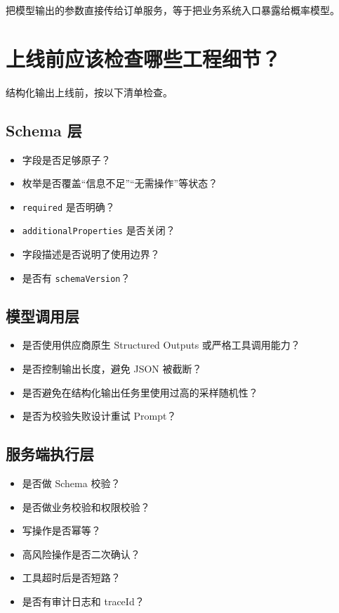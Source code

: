 \documentclass[9pt,a4paper,twocolumn]{ctexart}
\begin{document}
把模型输出的参数直接传给订单服务，等于把业务系统入口暴露给概率模型。



\section*{上线前应该检查哪些工程细节？}


结构化输出上线前，按以下清单检查。



\subsection*{Schema 层}

\begin{itemize}[itemsep=1pt, topsep=2pt]
  \item 字段是否足够原子？
  \item 枚举是否覆盖“信息不足”“无需操作”等状态？
  \item \texttt{required} 是否明确？
  \item \texttt{additionalProperties} 是否关闭？
  \item 字段描述是否说明了使用边界？
  \item 是否有 \texttt{schemaVersion}？
\end{itemize}


\subsection*{模型调用层}

\begin{itemize}[itemsep=1pt, topsep=2pt]
  \item 是否使用供应商原生 Structured Outputs 或严格工具调用能力？
  \item 是否控制输出长度，避免 JSON 被截断？
  \item 是否避免在结构化输出任务里使用过高的采样随机性？
  \item 是否为校验失败设计重试 Prompt？
\end{itemize}


\subsection*{服务端执行层}

\begin{itemize}[itemsep=1pt, topsep=2pt]
  \item 是否做 Schema 校验？
  \item 是否做业务校验和权限校验？
  \item 写操作是否幂等？
  \item 高风险操作是否二次确认？
  \item 工具超时后是否短路？
  \item 是否有审计日志和 traceId？
\end{itemize}
\end{document}
